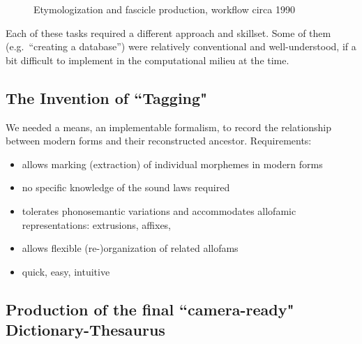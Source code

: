 \begin{figure}[ht]
\centering
{}
\caption{Etymologization and fascicle production, workflow circa 1990}
\label{fig:process1990}
\end{figure}

Each of these tasks required a different approach and skillset. Some
of them (e.g.\ ``creating a database'') were relatively conventional
and well-understood, if a bit difficult to implement in the
computational milieu at the time.

\subsection{The Invention of ``Tagging"}
We needed a means, an implementable formalism, to record the
relationship between modern forms and their reconstructed ancestor.
Requirements:
\begin{itemize}
\item  allows marking (extraction) of individual morphemes in modern forms
\item  no specific knowledge of the sound laws required
\item  tolerates phonosemantic variations and accommodates allofamic representations: extrusions, affixes, 
\item  allows flexible (re-)organization of related allofams
\item  quick, easy, intuitive
\end{itemize}


\subsection{Production of the final ``camera-ready" Dictionary-Thesaurus}


